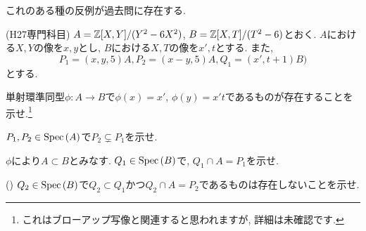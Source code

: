 これのある種の反例が過去問に存在する.
\begin{egprob} (H27専門科目)
$A=\mathbb{Z}[X,Y]/(Y^2-6X^2)$, $B=\mathbb{Z}[X,T]/(T^2-6)$とおく. $A$における$X,Y$の像を$x,y$とし, $B$における$X,T$の像を$x',t$とする. また,
\[P_1=(x,y,5)A, P_2 = (x-y,5)A, Q_1 = (x',t+1)B)\]
とする.
\ben
\item 単射環準同型$\phi:A\to B$で$\phi(x) = x'$, $\phi(y) = x't$であるものが存在することを示せ.\footnote{これはブローアップ写像と関連すると思われますが, 詳細は未確認です. }
\item $P_1,P_2\in \mathrm{Spec}\left( A \right)$で$P_2\subsetneq P_1$を示せ.
\item $\phi$により$A\subset B$とみなす. $Q_1\in \mathrm{Spec}\left( B \right)$で, $Q_1\cap A = P_1$を示せ.
\item () $Q_2\in \mathrm{Spec}\left( B \right)$で$Q_2\subset Q_1$かつ$Q_2\cap A = P_2$であるものは存在しないことを示せ.
\een
\end{egprob}
